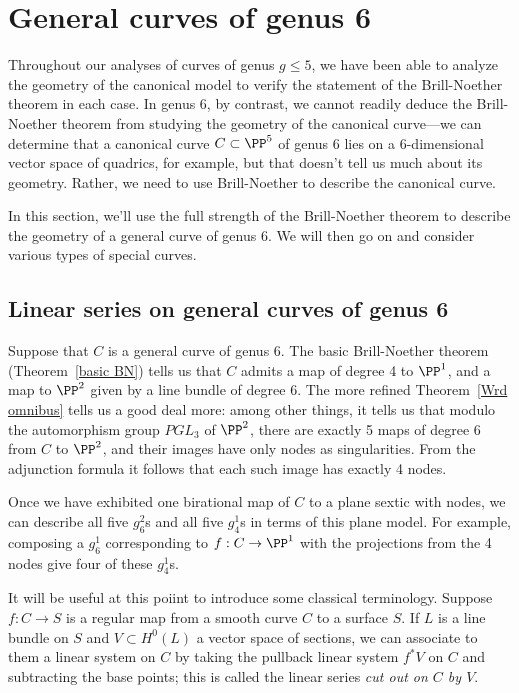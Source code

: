 \section{General curves of genus 6}\label{genus 6 section}


Throughout our analyses of curves of genus $g \leq 5$, we have been able to analyze the geometry of the canonical model to verify the statement of the Brill-Noether theorem in each case. In genus 6, by contrast, we cannot readily deduce the Brill-Noether theorem from studying the geometry of the canonical curve---we can determine that a canonical curve $C \subset \PP^5$ of genus 6 lies on a 6-dimensional vector space of quadrics, for example, but that doesn't tell us much about its geometry. Rather, we need to use Brill-Noether to describe the canonical curve. 

In this section, we'll use the full strength of the Brill-Noether theorem to describe the geometry of a general curve of genus 6. We will then go on and consider various types of special curves.

\subsection{Linear series on general curves of genus 6}

Suppose that $C$ is a general curve of genus 6. The basic Brill-Noether theorem (Theorem~\ref{basic BN}) tells us that $C$ admits a map of degree 4 to $\PP^1$, and a map to $\PP^2$ given by a line bundle of degree 6. The more refined Theorem~\ref{Wrd omnibus} tells us a good deal more: among other things, it tells us that modulo the automorphism group $PGL_3$ of $\PP^2$, there are exactly 5 maps of degree 6 from $C$ to $\PP^2$, and their images have only nodes
as singularities. From the adjunction formula it follows that each such image has exactly 4 nodes.
 
Once we have exhibited one birational map of $C$ to a plane sextic with nodes, we can describe all five $g^2_6$s and all five $g^1_4$s in terms of this plane model. For example, composing a $g^1_6$ corresponding to $f: C\to \PP^1$ with the projections from the 4 nodes give four of these $g^1_4$s. 

It will be useful at this poiint to introduce some classical terminology. Suppose $f : C \to S$ is a regular map from a smooth curve $C$ to a surface $S$. If $L$ is a line bundle on $S$ and $V \subset H^0(L)$ a vector space of sections, we can associate to them a linear system on $C$ by taking the pullback linear system $f^*V$ on $C$ and subtracting the base points; this is called the linear series \emph{cut out on $C$ by $V$}. 

